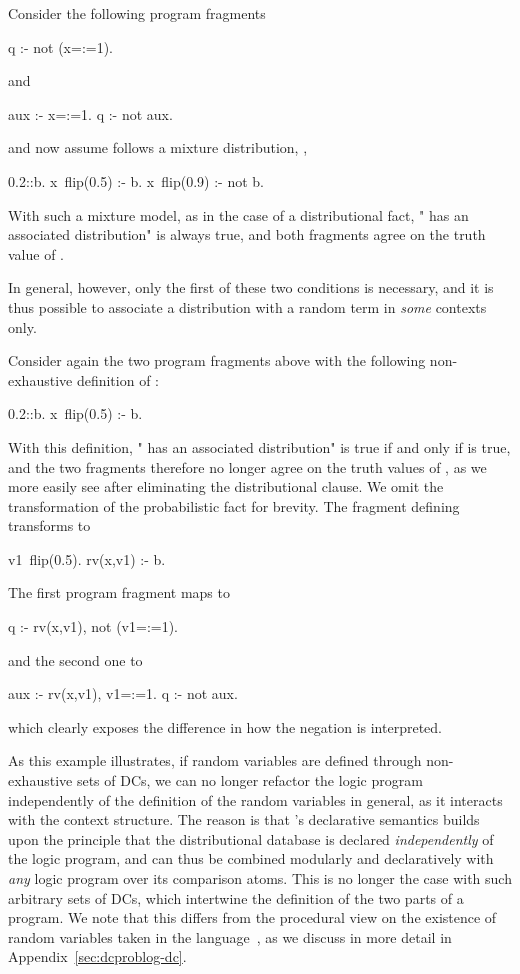\begin{example}
	Consider the  following program fragments
	\begin{problog}
q :- not (x=:=1).
	\end{problog}
	and
	\begin{problog}
aux :- x=:=1.
q :- not aux.
	\end{problog}
	and now assume  follows a mixture distribution, \eg,
	\begin{problog}
0.2::b.
x~flip(0.5) :- b.
x~flip(0.9) :- not b.
	\end{problog}
	With such a mixture model, as in the case of a distributional fact, " has an associated distribution" is always true, and both fragments agree on the truth value of .
\end{example}
In general, however, only the first of these two conditions is necessary, and it is thus possible to  associate a distribution with a random term in \emph{some} contexts only.

\begin{example}
	Consider again the two program fragments above with the following non-exhaustive definition of :
	\begin{problog}
0.2::b.
x~flip(0.5) :- b.
	\end{problog}
	With this definition, " has an associated distribution" is true if and only if  is true, and the two fragments therefore no longer agree on the truth values of , as we more easily see after eliminating the distributional clause. We omit the transformation of the probabilistic fact for brevity. The fragment defining  transforms to
	\begin{problog}
v1~flip(0.5).
rv(x,v1) :- b.
	\end{problog}
	The first program fragment maps to
	\begin{problog}
q :- rv(x,v1), not (v1=:=1).
	\end{problog}
	and the second one to
	\begin{problog}
aux :- rv(x,v1), v1=:=1.
q :- not aux.
	\end{problog}
	which clearly exposes the difference in how the negation is interpreted.
\end{example}
As this example illustrates, if random variables are defined through non-exhaustive sets of DCs, we can no longer refactor the logic program independently of the definition of the random variables in general, as it interacts with the context structure. The reason is that \dcproblogsty's declarative semantics builds upon the principle that the distributional database is declared \emph{independently} of the logic program, and can thus be combined modularly and declaratively with \emph{any} logic program over its comparison atoms. This is no longer the case with such arbitrary sets of DCs, which intertwine the definition of the two parts of a \dfplpsty program. We note that this differs from the procedural view on the existence of random variables taken in the \dcsty language~\citep{nitti2016probabilistic}, as we
discuss in more detail in Appendix~\ref{sec:dcproblog-dc}.

